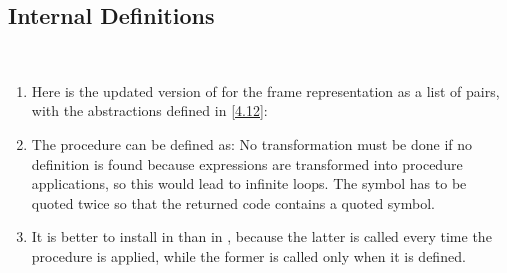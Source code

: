\subsection{Internal Definitions}

\begin{exe}[4.16]
    \label{4.16}
    \ \vspace{-20pt}
    \begin{enumerate}
        \item Here is the updated version of  for 
	    the frame representation as a list of pairs, with the abstractions 
	    defined in \autoref{4.12}:
        \item The  procedure can be defined as:
            No transformation must be done if no definition is found because 
             expressions are transformed into procedure applications, 
            so this would lead to infinite loops. The  symbol 
            has to be quoted twice so that the returned code contains a quoted 
            symbol.
        \item It is better to install  in 
             than in , because the 
            latter is called every time the procedure is applied, while the 
            former is called only when it is defined.
    \end{enumerate}
\end{exe}

